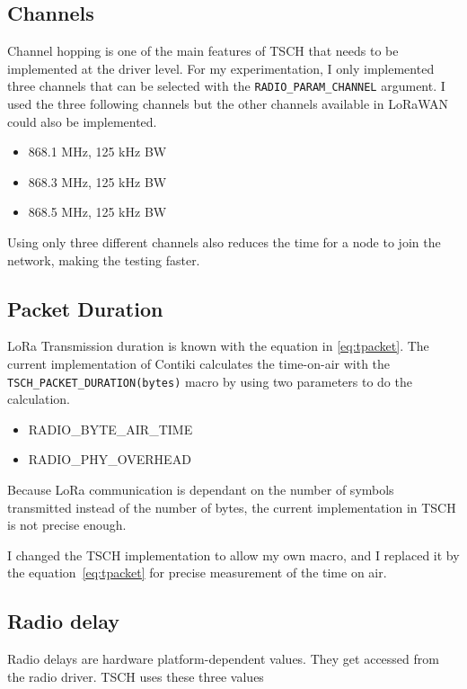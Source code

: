 \subsection{Channels}

Channel hopping is one of the main features of TSCH that needs to be implemented
at the driver level.
For my experimentation, I only implemented three channels that can be selected
with the \lstinline{RADIO_PARAM_CHANNEL} argument.
I used the three following channels but the other channels available in LoRaWAN
could also be implemented.

\begin{itemize}
  \item 868.1 MHz, 125 kHz BW
  \item 868.3 MHz, 125 kHz BW
  \item 868.5 MHz, 125 kHz BW
\end{itemize}

Using only three different channels also reduces the time for a node to join the
network, making the testing faster.

\subsection{Packet Duration\label{section:transmissiontime}}

LoRa Transmission duration is known with the equation in \ref{eq:tpacket}.
The current implementation of Contiki calculates the time-on-air with the
\lstinline{TSCH_PACKET_DURATION(bytes)} macro by using two parameters to do the
calculation.

\begin{itemize}
  \item RADIO\_BYTE\_AIR\_TIME
  \item RADIO\_PHY\_OVERHEAD
\end{itemize}

Because LoRa communication is dependant on the number of symbols transmitted
instead of the number of bytes, the current implementation in TSCH is not
precise enough.

I changed the TSCH implementation to allow my own macro, and
I replaced it by the equation~\ref{eq:tpacket} for precise measurement
of the time on air.

\subsection{Radio delay}

Radio delays are hardware platform-dependent values.
They get accessed from the radio driver.
TSCH uses these three values

